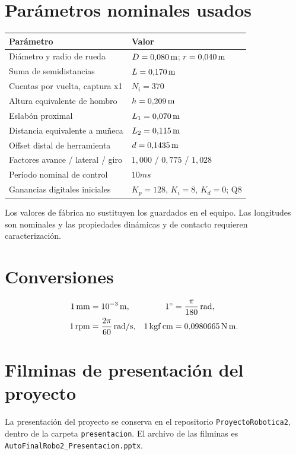 \section*{Parámetros nominales usados}
\begin{table}[!htbp]\centering
\begin{tabularx}{\linewidth}{@{}YP{50mm}@{}}\toprule
\textbf{Parámetro} & \textbf{Valor}\\\midrule
Diámetro y radio de rueda & $D=0{,}080\,\mathrm{m}$; $r=0{,}040\,\mathrm{m}$\\
Suma de semidistancias & $L=0{,}170\,\mathrm{m}$\\
Cuentas por vuelta, captura x1 & $N_i=370$\\
Altura equivalente de hombro & $h=0{,}209\,\mathrm{m}$\\
Eslabón proximal & $L_1=0{,}070\,\mathrm{m}$\\
Distancia equivalente a muñeca & $L_2=0{,}115\,\mathrm{m}$\\
Offset distal de herramienta & $d=0{,}1435\,\mathrm{m}$\\
Factores avance / lateral / giro & $1{,}000$ / $0{,}775$ / $1{,}028$\\
Período nominal de control & $10\unit{ms}$\\
Ganancias digitales iniciales & $K_p=128$, $K_i=8$, $K_d=0$; Q8\\\bottomrule
\end{tabularx}
\end{table}
Los valores de fábrica no sustituyen los guardados en el equipo. Las longitudes son nominales y las propiedades dinámicas y de contacto requieren caracterización.

\section*{Conversiones}
\begin{align}
1\,\mathrm{mm}&=10^{-3}\,\mathrm{m}, & 1^{\circ}&=\frac{\pi}{180}\,\mathrm{rad},\\
1\,\mathrm{rpm}&=\frac{2\pi}{60}\,\mathrm{rad/s}, &1\,\mathrm{kgf\,cm}&=0{,}0980665\,\mathrm{N\,m}.
\end{align}

\clearpage
\section*{Filminas de presentación del proyecto}
La presentación del proyecto se conserva en el repositorio \texttt{ProyectoRobotica2}, dentro de la carpeta \texttt{presentacion}. El archivo de las filminas es \texttt{AutoFinalRobo2\_Presentacion.pptx}.

